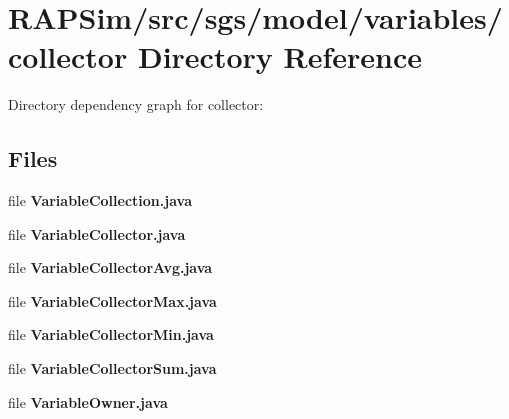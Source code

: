 \section{R\-A\-P\-Sim/src/sgs/model/variables/collector Directory Reference}
\label{dir_6c31ab5fdac2611d1bca327d645f4b83}
Directory dependency graph for collector\-:
\subsection*{Files}
\begin{DoxyCompactItemize}
\item 
file {\bf Variable\-Collection.\-java}
\item 
file {\bf Variable\-Collector.\-java}
\item 
file {\bf Variable\-Collector\-Avg.\-java}
\item 
file {\bf Variable\-Collector\-Max.\-java}
\item 
file {\bf Variable\-Collector\-Min.\-java}
\item 
file {\bf Variable\-Collector\-Sum.\-java}
\item 
file {\bf Variable\-Owner.\-java}
\end{DoxyCompactItemize}
